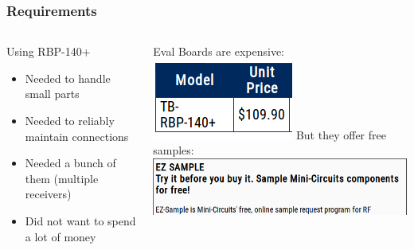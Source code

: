 \documentclass[]{beamer}
\begin{document}
\begin{frame}
    \frametitle{Requirements}
    \begin{columns}[T]
        \begin{column}[T]{5cm}
            {\large Using RBP-140+}
            \begin{itemize}
                \item{Needed to handle small parts}
                \item{Needed to reliably maintain connections}
                \item{Needed a bunch of them (multiple receivers)}
                \item{Did not want to spend a lot of money}
            \end{itemize}
        \end{column}
        \begin{column}[T]{5cm}
            Eval Boards are expensive:\\
            \includegraphics[keepaspectratio,scale=0.75]{images/eval_board.png}
            But they offer free samples:\\
            \includegraphics[keepaspectratio,scale=0.25]{images/ezsample.png}\\
        \end{column}
    \end{columns}
\end{frame}
\end{document}

